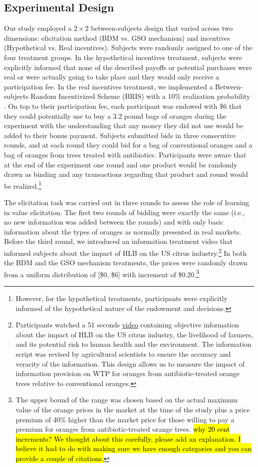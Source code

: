 \documentclass[12pt]{article}
\begin{document}
\subsection{Experimental Design}
Our study employed a $2\times2$ between-subjects design that varied across two dimensions: elicitation method (BDM vs. GSO mechanism) and incentives (Hypothetical vs. Real incentives). Subjects were randomly assigned to one of the four treatment groups. In the hypothetical incentives treatment, subjects were explicitly informed that none of the described payoffs or potential purchases were real or were actually going to take place and they would only receive a participation fee. In the real incentives treatment, we implemented a Between-subjects Random Incentivized Scheme (BRIS) with a 10\% realization probability \citep{ahles_testing_2024}. On top to their participation fee, each participant was endowed with \$6 that they could potentially use to buy a 3.2 pound bags of oranges during the experiment with the understanding that any money they did not use would be added to their bonus payment. Subjects submitted bids in three consecutive rounds, and at each round they could bid for a bag of conventional oranges and a bag of oranges from trees treated with antibiotics. Participants were aware that at the end of the experiment one round and one product would be randomly drawn as binding and any transactions regarding that product and round would be realized.\footnote{ However, for the hypothetical treatments, participants were explicitly informed of the hypothetical nature of the endowment and decisions.}  

The elicitation task was carried out in three rounds to assess the role of learning \citep{corrigan2008testing, drichoutis2011role} in value elicitation. The first two rounds of bidding were exactly the same (i.e., no new information was added between the rounds) and with only basic information about the types of oranges as normally presented in real markets. Before the third round, we introduced an information treatment video that informed subjects about the impact of HLB on the US citrus industry.\footnote{Participants watched a 51 seconds \href{https://www.youtube.com/watch?v=_AqMBjB0ChM}{video} containing objective information about the impact of HLB on the US citrus industry, the livelihood of farmers, and its potential risk to human health and the environment. The information script was revised by agricultural scientists to ensure the accuracy and veracity of the information. This design allows us to measure the impact of information provision on WTP for oranges from antibiotic-treated orange trees relative to conventional oranges.} In both the BDM and the GSO mechanism treatments, the prices were randomly drawn from a uniform distribution of [\$0, \$6] with increment of \$0.20.\footnote{The upper bound of the range was chosen based on the actual maximum value of the orange prices in the market at the time of the study plus a price premium of 40\% higher than the market price for those willing to pay a premium for oranges from antibiotic-treated orange trees. \hl{why 20 cent increments? We thought about this carefully, please add an explanation. I believe it had to do with making sure we have enough categories and you can provide a couple of citations.}}
\end{document}
